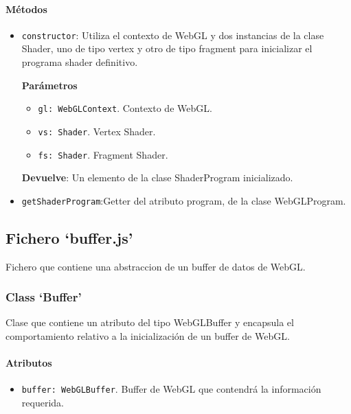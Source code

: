 \paragraph*{Métodos}
\begin{itemize}
    \item \verb|constructor|: Utiliza el contexto de WebGL y dos instancias de la clase Shader, uno de tipo vertex y otro de tipo fragment para inicializar el programa shader definitivo.
    
    \textbf{Parámetros}
    \begin{itemize}
        \item \verb|gl: WebGLContext|. Contexto de WebGL.
        \item \verb|vs: Shader|. Vertex Shader.
        \item \verb|fs: Shader|. Fragment Shader.
    \end{itemize}
    \textbf{Devuelve}: Un elemento de la clase ShaderProgram inicializado.
    \item \verb|getShaderProgram|:Getter del atributo program, de la clase WebGLProgram.
\end{itemize}

\subsection{Fichero `buffer.js'}

Fichero que contiene una abstraccion de un buffer de datos de WebGL.

\subsubsection{Class `Buffer'}

Clase que contiene un atributo del tipo WebGLBuffer y encapsula el comportamiento relativo a la inicialización de un buffer de WebGL. 

\paragraph*{Atributos}
\begin{itemize}
    \item \verb|buffer: WebGLBuffer|. Buffer de WebGL que contendrá la información requerida.
\end{itemize}


